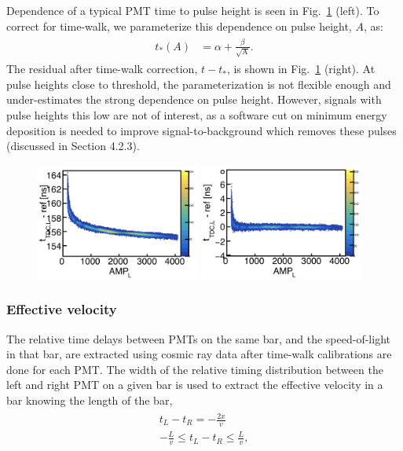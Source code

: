 \documentclass[review]{elsarticle}
\begin{document}
Dependence of a typical PMT time to pulse height is seen in Fig.~\ref{fig:time_walk} (left). To correct for time-walk, we parameterize 
this dependence on pulse height, $A$, as:
\begin{eqnarray}
	\begin{split}
		t_*(A)	&= \alpha + \frac{\beta}{\sqrt{\textrm{A}}}.				
		\label{eqn:time_walk}
	\end{split}
\end{eqnarray}
The residual after time-walk correction, $t-t_*$, is shown in Fig.~\ref{fig:time_walk} (right). At pulse heights close to threshold, the 
parameterization is not flexible enough and under-estimates the strong dependence on pulse height. However, signals with pulse 
heights this low are not of interest, as a software cut on minimum energy deposition is needed to improve signal-to-background 
which removes these pulses (discussed in Section {\color{red}4.2.3}).

\begin{figure}[h!]
	\centering
		\includegraphics[width=0.48\textwidth]{tw_before.png}
		\includegraphics[width=0.48\textwidth]{tw_after.png}
	\caption{}
	\label{fig:time_walk}
\end{figure}

\subsubsection{Effective velocity}
The relative time delays between PMTs on the same bar, and the speed-of-light in that bar, are extracted using cosmic ray 
data after time-walk calibrations are done for each PMT. The width of the relative timing distribution between the left and 
right PMT on a given bar is used to extract the effective velocity in a bar knowing the length of the bar,
\begin{eqnarray}
	\begin{split}
		t_L - t_R 	= -\frac{2x}{v}							\\
		 -\frac{L}{v}	\leq 	t_L - t_R 	\leq \frac{L}{v},				
		 \label{eqn:time_walk}
	\end{split}
\end{eqnarray}
\end{document}
